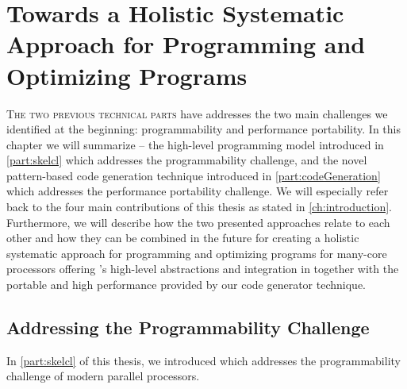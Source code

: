 
\chapter[Towards a Holistic Systematic Approach for\\ Programming and Optimizing Programs]{Towards a Holistic Systematic Approach for Programming and Optimizing Programs}

\label{ch:seventh} %

\lettrine[lines=3, loversize=0.1]{T}{he two previous technical parts} have addresses the two main challenges we identified at the beginning: programmability and performance portability.
In this chapter we will summarize \SkelCL -- the high-level programming model introduced in \autoref{part:skelcl} which addresses the programmability challenge, and the novel pattern-based code generation technique introduced in \autoref{part:codeGeneration} which addresses the performance portability challenge.
We will especially refer back to the four main contributions of this thesis as stated in \autoref{ch:introduction}.
Furthermore, we will describe how the two presented approaches relate to each other and how they can be combined in the future for creating a holistic systematic approach for programming and optimizing programs for many-core processors offering \SkelCL's high-level abstractions and integration in \Cpp together with the portable and high performance provided by our code generator technique.

\section{Addressing the Programmability Challenge}

In \autoref{part:skelcl} of this thesis, we introduced \SkelCL which addresses the programmability challenge of modern parallel processors.

